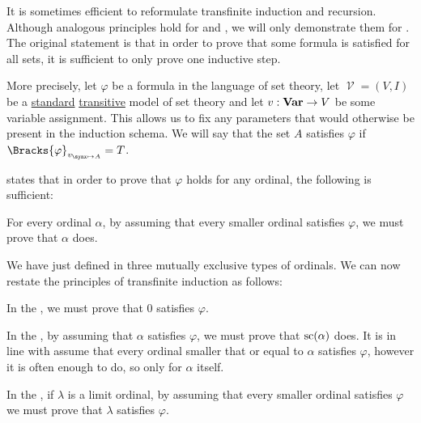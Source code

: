 \begin{remark}\label{rem:transfinite_induction}
  It is sometimes efficient to reformulate transfinite induction and recursion. Although analogous principles hold for  and , we will only demonstrate them for . The original statement is that in order to prove that some formula is satisfied for all sets, it is sufficient to only prove one inductive step.

  More precisely, let \( \varphi \) be a formula in the language of set theory, let \( \mscrV = (V, I) \) be a \hyperref[rem:standard_model_of_set_theory]{standard} \hyperref[rem:transitive_model_of_set_theory]{transitive} model of set theory and let \( v: \op*{Var} \to V \) be some variable assignment. This allows us to fix any parameters that would otherwise be present in the induction schema. We will say that the set \( A \) satisfies \( \varphi \) if \( \Bracks{\varphi}_{v_{\synx \mapsto A}} = T \).

   states that in order to prove that \( \varphi \) holds for any ordinal, the following is sufficient:
  \begin{thmenum}[series=rem:transfinite_induction]
     For every ordinal \( \alpha \), by assuming that every smaller ordinal satisfies \( \varphi \), we must prove that \( \alpha \) does.
  \end{thmenum}

  We have just defined in  three mutually exclusive types of ordinals. We can now restate the principles of transfinite induction as follows:
  \begin{thmenum}[resume=rem:transfinite_induction]
     In the , we must prove that \( 0 \) satisfies \( \varphi \).

     In the , by assuming that \( \alpha \) satisfies \( \varphi \), we must prove that \( \op{sc}(\alpha) \) does. It is in line with  assume that every ordinal smaller that or equal to \( \alpha \) satisfies \( \varphi \), however it is often enough to do, so only for \( \alpha \) itself.

     In the , if \( \lambda \) is a limit ordinal, by assuming that every smaller ordinal satisfies \( \varphi \) we must prove that \( \lambda \) satisfies \( \varphi \).
  \end{thmenum}


\end{remark}
